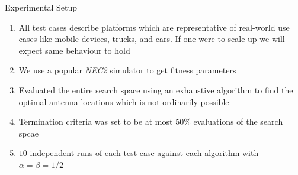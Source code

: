 \documentclass{beamer}
\begin{document}
\begin{frame}{Experimental Setup}
    \begin{enumerate}\itemsep1.2em
        \item All test cases describe platforms which are representative of real-world use cases like mobile devices, trucks, and cars. If one were to scale up we will expect same behaviour to hold
        \item We use a popular \textit{NEC2} simulator to get fitness parameters 
        \item Evaluated the entire search space using an exhaustive algorithm to find the optimal antenna locations which is not ordinarily possible
        \item Termination criteria was set to be at most $50\%$ evaluations of the search spcae
        \item $10$ independent runs of each test case against each algorithm with $\alpha = \beta = 1/2$
    \end{enumerate}
    \vspace{10mm}
\end{frame}
\end{document}

